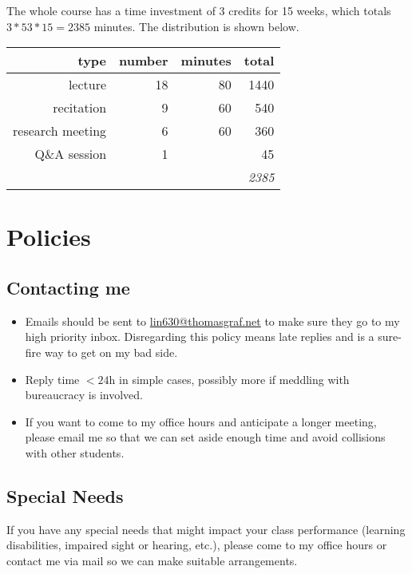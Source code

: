 \medskip
The whole course has a time investment of 3 credits for 15 weeks, which totals $3*53*15=2385$ minutes.
The distribution is shown below.
\medskip
%
\begin{center}
    \begin{tabular}{rrrr}
        \toprule
        \textbf{type}    & \textbf{number} & \textbf{minutes} & \textbf{total}\\
        \midrule
        lecture          & 18              & 80               & 1440\\
        recitation       & 9               & 60               & 540\\
        research meeting & 6               & 60               & 360\\
        Q\&A session     & 1               &                  & 45\\
        \midrule
                         &                 &                  & \emph{2385}\\
        \bottomrule
    \end{tabular}
\end{center}

\section{Policies}

\subsection{Contacting me}
\begin{itemize}
    \item Emails should be sent to \href{mailto://lin630@thomasgraf.net}{lin630@thomasgraf.net} to make sure they go to my high priority inbox.
        Disregarding this policy means late replies and is a sure-fire way to get on my bad side.
    \item Reply time $<24$h in simple cases, possibly more if meddling with bureaucracy is involved.
    \item If you want to come to my office hours and anticipate a longer meeting, please email me so that we can set aside enough time and avoid collisions with other students.
\end{itemize}

\subsection{Special Needs}
If you have any special needs that might impact your class performance (learning disabilities, impaired sight or hearing, etc.), please come to my office hours or contact me via mail so we can make suitable arrangements.


